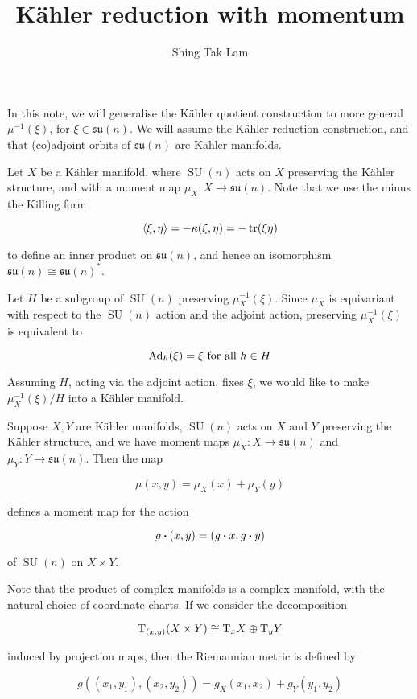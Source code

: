 \documentclass{article}
\title{K\"ahler reduction with momentum}
\author{Shing Tak Lam}
\DeclareMathOperator{\SU}{SU}
\newcommand{\su}{\mathfrak{su}}
\begin{document}
\maketitle

In this note, we will generalise the K\"ahler quotient construction to more general \(\mu^{-1}(\xi)\), for \(\xi \in \su(n)\). We will assume the K\"ahler reduction construction, and that (co)adjoint orbits of \(\su(n)\) are K\"ahler manifolds.

Let \(X\) be a K\"ahler manifold, where \(\SU(n)\) acts on \(X\) preserving the K\"ahler structure, and with a moment map \(\mu_X : X \to \su(n)\). Note that we use the minus the Killing form

\[\left\langle \xi, \eta \right\rangle = -\kappa(\xi, \eta) = -\tr(\xi\eta)\]

to define an inner product on \(\su(n)\), and hence an isomorphism \(\su(n) \cong \su(n)^*\).

Let \(H\) be a subgroup of \(\SU(n)\) preserving \(\mu_X^{-1}(\xi)\). Since \(\mu_X\) is equivariant with respect to the \(\SU(n)\) action and the adjoint action, preserving \(\mu_X^{-1}(\xi)\) is equivalent to

\[\operatorname{Ad}_h(\xi) = \xi \text{ for all }h \in H\]

Assuming \(H\), acting via the adjoint action, fixes \(\xi\), we would like to make \(\mu_X^{-1}(\xi)/H\) into a K\"ahler manifold.

\begin{lemma}
    Suppose \(X, Y\) are K\"ahler manifolds, \(\SU(n)\) acts on \(X\) and \(Y\) preserving the K\"ahler structure, and we have moment maps \(\mu_X : X \to \su(n)\) and \(\mu_Y : Y \to \su(n)\). Then the map

    \[\mu(x, y) = \mu_X(x) + \mu_Y(y)\]

    defines a moment map for the action

    \[g\vdot(x, y) = (g\vdot x, g\vdot y)\]

    of \(\SU(n)\) on \(X \times Y\).
\end{lemma}

Note that the product of complex manifolds is a complex manifold, with the natural choice of coordinate charts. If we consider the decomposition

\[\mathrm{T}_{(x, y)}(X \times Y) \cong \mathrm{T}_xX \oplus \mathrm{T}_yY\]

induced by projection maps, then the Riemannian metric is defined by

\[g((x_1, y_1), (x_2, y_2)) = g_X(x_1, x_2) + g_Y(y_1, y_2)\]
\end{document}
